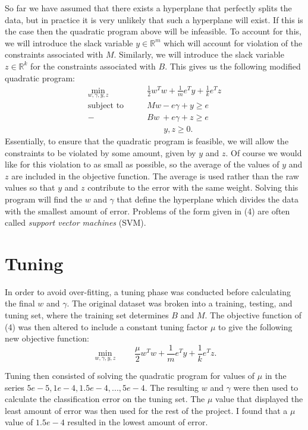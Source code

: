 \documentclass[10pt]{article}
\begin{document}
So far we have assumed that there exists a hyperplane that perfectly splits the data, but in practice it is very unlikely that such a hyperplane will exist. If this is the case then the quadratic program above will be infeasible. To account for this, we will introduce the slack variable $y \in \mathbb{R}^m$ which will account for violation of the constraints associated with $M$. Similarly, we will introduce the slack variable $z \in \mathbb{R}^k$ for the constraints associated with $B$. This gives us the following modified quadratic program:
\begin{equation}
\begin{split}
\min_{w, \gamma,y,z} \qquad & \frac{1}{2} w^Tw + \frac{1}{m}e^Ty + \frac{1}{k}e^Tz\\
\text{subject to}  \qquad & Mw - e \gamma +y \geq e \\
- & Bw \ + e \gamma +z \geq e \\
& \qquad y, z \geq 0.
\end{split}
\end{equation}
Essentially, to ensure that the quadratic program is feasible, we will allow the constraints to be violated by some amount, given by $y$ and $z$. Of course we would like for this violation to as small as possible, so the average of the values of $y$ and $z$ are included in the objective function.  The average is used rather than the raw values so that $y$ and $z$ contribute to the error with the same weight. Solving this program will find the $w$ and $\gamma$ that define the hyperplane which divides the data with the smallest amount of error. Problems of the form given in (4) are often called \textit{support vector machines} (SVM).

\section{Tuning}
In order to avoid over-fitting, a tuning phase was conducted before calculating the final $w$ and $\gamma$. The original dataset was broken into a training, testing, and tuning set, where the training set determines $B$ and $M$. The objective function of (4) was then altered to include a constant tuning factor $\mu$ to give the following new objective function:
\begin{equation}
\min_{w, \gamma,y,z} \qquad  \frac{\mu}{2} w^Tw + \frac{1}{m}e^Ty + \frac{1}{k}e^Tz.
\end{equation}

Tuning then consisted of solving the quadratic program for values of $\mu$ in the series $5e -5,1e-4,1.5e-4,...,5e-4$. The resulting $w$ and $\gamma$ were then used to calculate the classification error on the tuning set. The $\mu$ value that displayed the least amount of error was then used for the rest of the project. I found that a $\mu$ value of $1.5e-4$ resulted in the lowest amount of error.
\end{document}
